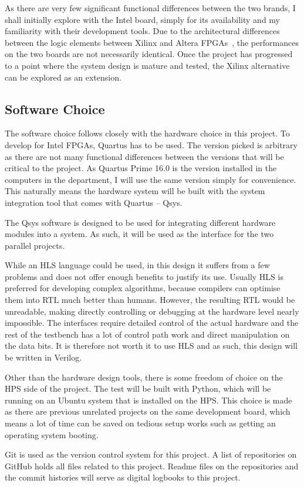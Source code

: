 As there are very few significant functional differences between the two brands,
I shall initially explore with the Intel board, simply for its
availability and my familiarity with their development tools.
Due to the architectural differences between the logic elements between Xilinx
and Altera FPGAs~\cite{Scekic1}, the performances on the two boards are not
necessarily identical.
Once the project has progressed to a point where the system design is mature and
tested, the Xilinx alternative can be explored as an extension.

\subsection{Software Choice}
The software choice follows closely with the hardware choice in this project.
To develop for Intel FPGAs, Quartus has to be used.
The version picked is arbitrary as there are not many functional differences
between the versions that will be critical to the project.
As Quartus Prime 16.0 is the version installed in the computers in the
department, I will use the same version simply for convenience.
This naturally means the hardware system will be built with the system
integration tool that comes with Quartus -- Qsys.

The Qsys software is designed to be used for integrating different hardware
modules into a system.
As such, it will be used as the interface for the two parallel projects.

While an HLS language could be used, in this design it suffers from a few
problems and does not offer enough benefits to justify its use.
Usually HLS is preferred for developing complex algorithms, because compilers
can optimise them into RTL much better than humans.
However, the resulting RTL would be unreadable, making directly controlling or
debugging at the hardware level nearly impossible.
The interfaces require detailed control of the actual hardware and the rest of
the testbench has a lot of control path work and direct manipulation on the
data bits.
It is therefore not worth it to use HLS and as such, this design will be written
in Verilog.

Other than the hardware design tools, there is some freedom of choice on the
HPS side of the project.
The test will be built with Python, which will be running on an Ubuntu system
that is installed on the HPS.
This choice is made as there are previous unrelated projects on the same
development board, which means a lot of time can be saved on tedious setup works
such as getting an operating system booting.

Git is used as the version control system for this project.
A list of repositories on GitHub holds all files related to this project.
Readme files on the repositories and the commit histories will serve as
digital logbooks to this project.
